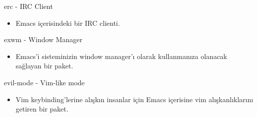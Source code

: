 \documentclass[presentation,smaller]{beamer}
\begin{document}
\begin{frame}[label={sec:org7164442}]{erc - IRC Client}
\begin{itemize}
\item Emacs içerisindeki bir IRC clienti.
\end{itemize}
\end{frame}
\begin{frame}[label={sec:org9b6e3d4}]{exwm - Window Manager}
\begin{itemize}
\item Emacs'i sisteminizin window manager'ı olarak kullanmanıza olanacak sağlayan bir
paket.
\end{itemize}
\end{frame}
\begin{frame}[label={sec:org7fb694c}]{evil-mode - Vim-like mode}
\begin{itemize}
\item Vim keybinding'lerine alışkın insanlar için Emacs içerisine vim
alışkanlıklarını getiren bir paket.
\end{itemize}
\end{frame}
\end{document}
